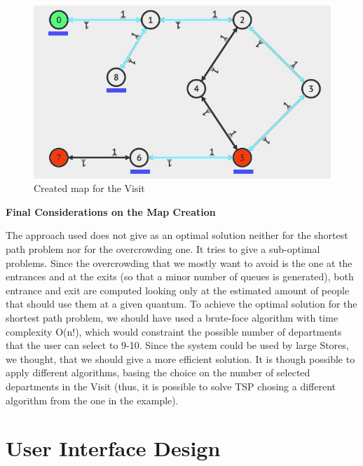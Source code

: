 \documentclass[a4paper, 12pt, oneside, table]{article}
\begin{document}
\begin{enumerate}
\begin{figure}[H]
    \centering
    	\centering
      	\includegraphics[height=0.4\textheight, scale=0.2, keepaspectratio]{img/alg_map_man/store_graph_PATH.JPG}
    	\caption{Created map for the Visit}
     	\label{afterDij}
    \end{figure}
\end{enumerate}

\vspace{0.4em}
\textbf{Final Considerations on the Map Creation} \newline
\vspace{0.4em}

The approach used does not give as an optimal solution neither for the shortest path problem nor for the overcrowding one. It tries to give a sub-optimal problems. Since the overcrowding that we mostly want to avoid is the one at the entrances and at the exits (so that a minor number of queues is generated), both entrance and exit are computed looking only at the estimated amount of people that should use them at a given quantum. \newline
To achieve the optimal solution for the shortest path problem, we should have used a brute-foce algorithm with time complexity O(n!), which would constraint the possible number of departments that the user can select to 9-10. Since the system could be used by large Stores, we thought, that we should give a more efficient solution. It is though possible to apply different algorithms, basing the choice on the number of selected departments in the Visit (thus, it is possible to solve TSP chosing a different algorithm from the one in the example).


\newpage
\section{User Interface Design}
\end{document}
